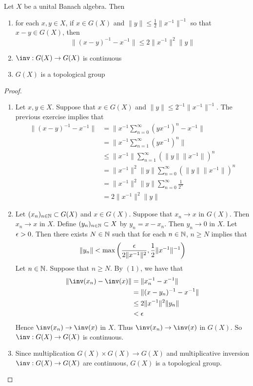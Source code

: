 \documentclass{book}
\begin{document}
\begin{ex}
	Let $X$ be a unital Banach algebra. Then
	\begin{enumerate}
		\item for each $x,y \in X$, if $x \in G(X)$ and $\|y\| \leq \frac{1}{2} \|x^{-1}\|^{-1}$ so that $x - y \in G(X)$, then  
		$$\|(x-y)^{-1} - x^{-1}\| \leq 2 \|x^{-1}\|^2 \|y\|$$
		\item $\inv: G(X) \rightarrow G(X)$ is continuous
		\item $G(X)$ is a topological group
	\end{enumerate}
\end{ex}

\begin{proof}\
	\begin{enumerate}
		\item Let $x,y \in X$. Suppose that $x \in G(X)$ and $\|y\| \leq 2^{-1} \|x^{-1}\|^{-1}$. The previous exercise implies that 
		\begin{align*}
			\|(x - y)^{-1} - x^{-1}\|
			& = \bigg \| x^{-1}\sum_{n=0}^{\infty}(yx^{-1})^n  - x^{-1}\bigg\| \\
			& = \bigg \| x^{-1}\sum_{n=1}^{\infty}(yx^{-1})^n  \bigg\| \\
			& \leq \|x^{-1}\| \sum_{n=1}^{\infty} (\|y\|\|x^{-1}\|)^n \\
			& = \|x^{-1}\|^{2} \|y\| \sum_{n=0}^{\infty} (\|y\|\|x^{-1}\|)^n \\ 
			& = \|x^{-1}\|^{2} \|y\| \sum_{n=0}^{\infty} \frac{1}{2^n} \\
			& = 2 \|x^{-1}\|^{2} \|y\| 
		\end{align*}
		\item Let $(x_n)_{n \in \mathbb{N}} \subset G(X)$ and $x \in G(X)$. Suppose that $x_n \rightarrow x$ in $G(X)$. Then $x_n \rightarrow x$ in $X$. Define $(y_n)_{n \in \mathbb{N}} \subset X$ by $y_n = x - x_n$. Then $y_n \rightarrow 0$ in $X$. Let $\epsilon > 0$. Then there exists $N \in \mathbb{N}$ such that for each $n \in \mathbb{N}$, $n \geq N$ implies that 
		$$\|y_n \| < \max \bigg(\frac{\epsilon}{2\|x^{-1}\|^2}, \frac{1}{2} \|x^{-1}\|^{-1} \bigg)$$
		Let $n \in \mathbb{N}$. Suppose that $n \geq N$. By $(1)$, we have that 
		\begin{align*}
			\|\inv(x_n) - \inv(x)\|
			& = \|x_n^{-1} - x^{-1}\| \\
			& = \|(x - y_n)^{-1} - x^{-1}\| \\
			& \leq 2\|x^{-1}\|^2\|y_n\| \\
			& < \ep 
		\end{align*} 
		Hence $\inv(x_n) \rightarrow \inv(x)$ in $X$. Thus $\inv(x_n) \rightarrow \inv(x)$ in $G(X)$. So $\inv: G(X) \rightarrow G(X)$ is continuous. 
		\item Since multiplication $G(X) \times G(X) \rightarrow G(X)$ and multiplicative inversion $\inv: G(X) \rightarrow G(X)$ are continuous, $G(X)$ is a topological group. 
	\end{enumerate}
\end{proof}
\end{document}
